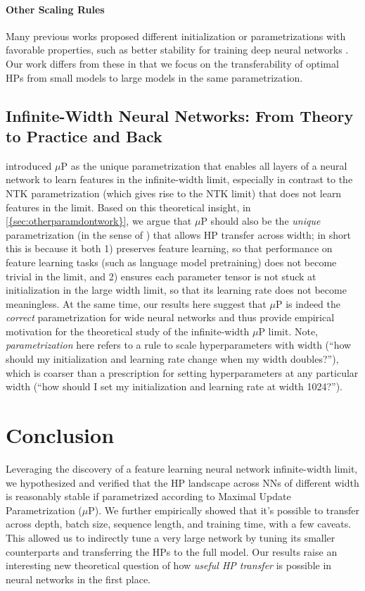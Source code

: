 \documentclass{article}
\theoremstyle{definition}
\begin{document}
\paragraph{Other Scaling Rules}
Many previous works proposed different initialization or parametrizations with favorable properties, such as better stability for training deep neural networks \cite{glorot_understanding_2010,schoenholz_deep_2016,yang_mean_2017,yang_layerwise_2018,zhang_residual_2019,bachlechner_rezero_2020,huang_improving_nodate,liu_understanding_2020}.
Our work differs from these in that we focus on the transferability of optimal HPs from small models to large models in the same parametrization.

\subsection{Infinite-Width Neural Networks: From Theory to Practice and Back}

\citep{TP4} introduced $\mu$P as the unique parametrization that enables all layers of a neural network to learn features in the infinite-width limit, especially in contrast to the NTK parametrization \citep{jacot_neural_2018} (which gives rise to the NTK limit) that does not learn features in the limit.
Based on this theoretical insight, in \cref{{sec:otherparamdontwork}}, we argue that $\mu$P should also be the \emph{unique} parametrization (in the sense of \citep{TP4}) that allows HP transfer across width;
in short this is because it both 1) preserves feature learning, so that performance on feature learning tasks (such as language model pretraining) does not become trivial in the limit, and 2) ensures each parameter tensor is not stuck at initialization in the large width limit, so that its learning rate does not become meaningless.
At the same time, our results here suggest that $\mu$P is indeed the \emph{correct} parametrization for wide neural networks and thus provide empirical motivation for the theoretical study of the infinite-width $\mu$P limit.
Note, \emph{parametrization} here refers to a rule to scale hyperparameters with width (``how should my initialization and learning rate change when my width doubles?''), which is coarser than a prescription for setting hyperparameters at any particular width (``how should I set my initialization and learning rate at width 1024?'').

\section{Conclusion}
\label{sec:conclusion}
Leveraging the discovery of a feature learning neural network infinite-width limit, we hypothesized and verified that the HP landscape across NNs of different width is reasonably stable if parametrized according to Maximal Update Parametrization ($\mu$P).
We further empirically showed that it's possible to transfer across depth, batch size, sequence length, and training time, with a few caveats.
This allowed us to indirectly tune a very large network by tuning its smaller counterparts and transferring the HPs to the full model.
Our results raise an interesting new theoretical question of how \emph{useful HP transfer} is possible in neural networks in the first place.
\end{document}
